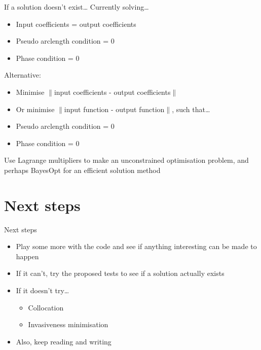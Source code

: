 \documentclass[presentation]{beamer}
\begin{document}
\begin{frame}[label={sec:org66f6999}]{If a solution doesn't exist\ldots{}}
Currently solving\ldots{}
\begin{itemize}
\item Input coefficients = output coefficients
\item Pseudo arclength condition = 0
\item Phase condition = 0
\end{itemize}
\vfill
Alternative: 
\begin{itemize}
\item Minimise \(\|\)input coefficients - output coefficients\(\|\)
\item Or minimise \(\|\)input function - output function\(\|\), such that\ldots{}
\item Pseudo arclength condition = 0
\item Phase condition = 0
\end{itemize}
\vfill
Use Lagrange multipliers to make an unconstrained optimisation problem, and perhaps BayesOpt for an efficient solution method
\end{frame}


\section{Next steps}
\label{sec:orgdfe604c}
\begin{frame}[label={sec:orgbb8b436}]{Next steps}
\begin{itemize}
\item Play some more with the code and see if anything interesting can be made to happen
\item If it can't, try the proposed tests to see if a solution actually exists
\item If it doesn't try\ldots{}
\begin{itemize}
\item Collocation
\item Invasiveness minimisation
\end{itemize}
\item Also, keep reading and writing
\end{itemize}
\end{frame}
\end{document}
